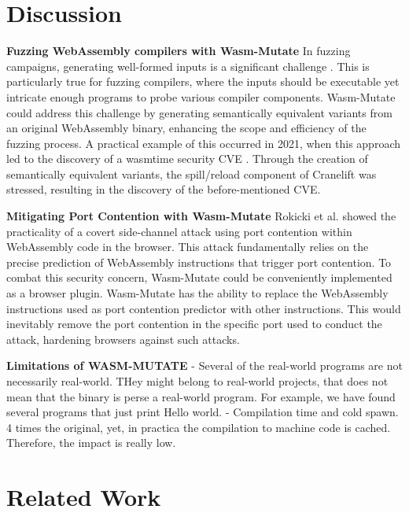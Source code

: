 \documentclass[a4paper,fleqn]{cas-dc}
\newcommand*\badge[1]{ \colorbox{red}{\color{white}#1}}
\newcommand{\tool}{{\sc Wasm-Mutate}\xspace}
\newcommand{\Wasm}{WebAssembly\xspace}
\newcommand{\wasm}{\Wasm}
\newcommand{\todo}[1]{%
\refstepcounter{todo}
\noindent\textbf{\badge{TODO}} {\color{red}#1}
\addcontentsline{td}{todo}
{\color{red}\thesection.\thetodo\xspace #1}}
\begin{document}
\section{Discussion}
\label{discussion}


\textbf{Fuzzing \Wasm compilers with \tool}
In fuzzing campaigns, generating well-formed inputs is a significant challenge \cite{7958599}. 
This is particularly true for fuzzing compilers, where the inputs should be executable yet intricate enough programs to probe various compiler components. 
\tool could address this challenge by generating semantically equivalent variants from an original \wasm binary, enhancing the scope and efficiency of the fuzzing process. 
A practical example of this occurred in 2021, when this approach led to the discovery of a wasmtime security CVE \cite{CVE}. 
Through the creation of semantically equivalent variants, the spill/reload component of Cranelift was stressed, resulting in the discovery of the before-mentioned CVE.



\textbf{Mitigating Port Contention with \tool} 
Rokicki et al. \cite{10.1145/3488932.3517411} showed the practicality of a covert side-channel attack using port contention within \Wasm code in the browser. This attack fundamentally relies on the precise prediction of WebAssembly instructions that trigger port contention.
To combat this security concern, \tool could be conveniently implemented as a browser plugin. 
\tool has the ability to replace the \wasm instructions used as port contention predictor with other instructions.
This would inevitably remove the port contention in the specific port used to conduct the attack, hardening browsers against such attacks.


{
\color{blue}

\textbf{Limitations of WASM-MUTATE}
- Several of the real-world programs are not necessarily real-world. THey might belong to real-world projects, that does not mean that the binary is perse a real-world program. For example, we have found several programs that just print Hello world. 
- Compilation time and cold spawn. 4 times the original, yet, in practica the compilation to machine code is cached. Therefore, the impact is really low. 
}


\section{Related Work}
\label{rw}

\end{document}
